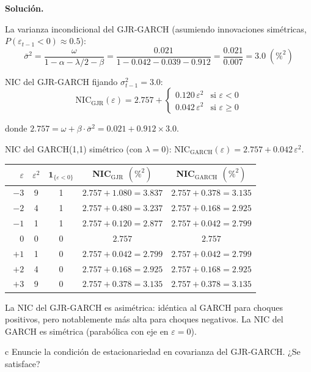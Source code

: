 \documentclass[11pt,a4paper]{article}
\newcommand{\sigmabar}{\bar{\sigma}^2}
\newcommand{\eps}{\varepsilon}
\begin{document}
\textbf{Solución.}

La varianza incondicional del GJR-GARCH (asumiendo innovaciones simétricas, $P(\eps_{t-1}<0)\approx 0.5$):
\[
\sigmabar = \frac{\omega}{1 - \alpha - \lambda/2 - \beta} = \frac{0.021}{1 - 0.042 - 0.039 - 0.912} = \frac{0.021}{0.007} = 3.0 \; (\%^2)
\]

NIC del GJR-GARCH fijando $\sigma^2_{t-1}=3.0$:
\[
\text{NIC}_{\text{GJR}}(\eps) = 2.757 +
\begin{cases}
0.120\,\eps^2 & \text{si } \eps < 0 \\
0.042\,\eps^2 & \text{si } \eps \geq 0
\end{cases}
\]

donde $2.757 = \omega + \beta\cdot\sigmabar = 0.021 + 0.912\times3.0$.

NIC del GARCH(1,1) simétrico (con $\lambda=0$): $\text{NIC}_{\text{GARCH}}(\eps) = 2.757 + 0.042\,\eps^2$.

\begin{center}
\begin{tabular}{@{}rcccc@{}}
\toprule
$\eps$ & $\eps^2$ & $\mathbf{1}_{\{\eps<0\}}$ & NIC$_{\text{GJR}}$ $(\%^2)$ & NIC$_{\text{GARCH}}$ $(\%^2)$ \\
\midrule
$-3$ & 9 & 1 & $2.757 + 1.080 = 3.837$ & $2.757 + 0.378 = 3.135$ \\
$-2$ & 4 & 1 & $2.757 + 0.480 = 3.237$ & $2.757 + 0.168 = 2.925$ \\
$-1$ & 1 & 1 & $2.757 + 0.120 = 2.877$ & $2.757 + 0.042 = 2.799$ \\
$\phantom{-}0$ & 0 & 0 & $2.757$ & $2.757$ \\
$+1$ & 1 & 0 & $2.757 + 0.042 = 2.799$ & $2.757 + 0.042 = 2.799$ \\
$+2$ & 4 & 0 & $2.757 + 0.168 = 2.925$ & $2.757 + 0.168 = 2.925$ \\
$+3$ & 9 & 0 & $2.757 + 0.378 = 3.135$ & $2.757 + 0.378 = 3.135$ \\
\bottomrule
\end{tabular}
\end{center}

La NIC del GJR-GARCH es asimétrica: idéntica al GARCH para choques positivos, pero notablemente más alta para choques negativos. La NIC del GARCH es simétrica (parabólica con eje en $\eps=0$).

\begin{cajaInciso}{c}
Enuncie la condición de estacionariedad en covarianza del GJR-GARCH. ¿Se satisface?
\end{cajaInciso}
\end{document}
